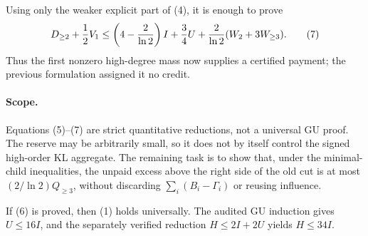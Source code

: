 Using only the weaker explicit part of (4), it is enough to prove
\[
 D_{\ge2}+{1\over2}V_1
 \le\left(4-{2\over\ln2}\right)I+{3\over4}U
 +{2\over\ln2}(W_2+3W_{\ge3}).                         \tag{7}
\]
Thus the first nonzero high-degree mass now supplies a certified payment;
the previous formulation assigned it no credit.

\paragraph{Scope.}
Equations (5)--(7) are strict quantitative reductions, not a universal GU
proof.  The reserve may be arbitrarily small, so it does not by itself
control the signed high-order KL aggregate.  The remaining task is to
show that, under the minimal-child inequalities, the unpaid excess above
the right side of the old cut is at most $(2/\ln2)Q_{\ge3}$, without
discarding $\sum_i(B_i-\Gamma_i)$ or reusing influence.

If (6) is proved, then (1) holds universally.  The audited GU induction
gives $U\le16I$, and the separately verified reduction
$H\le2I+2U$ yields $H\le34I$.
